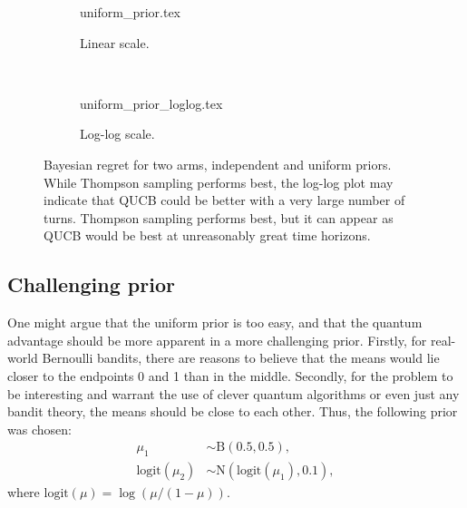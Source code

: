 \begin{figure}
    \centering
    \begin{subfigure}{\textwidth}
        \centering
        \newcommand{\myoptions}{
            width=10cm,
            height=8cm,
            xlabel={Turn},
            ylabel={Regret},
            legend entries={UCB, QUCB, Thompson},
            legend pos=north west,
            legend cell align=left,
            mystyle,
            largexnumbers,
            ymax = 135,
        }
        {uniform_prior.tex}
        \caption{Linear scale.}
    \end{subfigure}
    \\[3ex]
    \begin{subfigure}{\textwidth}
        \centering
        \newcommand{\myoptions}{
            width=10cm,
            height=8cm,
            xlabel={Turn},
            ylabel={Regret},
            legend entries={UCB, QUCB, Thompson},
            legend pos=north west,
            legend cell align=left,
            mystyle,
            largexnumbers,
        }
        {uniform_prior_loglog.tex}
        \caption{Log-log scale.}
    \end{subfigure}
    \caption[
        Bayesian regret for two arms, independent and uniform priors.
    ]
    {
        Bayesian regret for two arms, independent and uniform priors.
        While Thompson sampling performs best, the log-log plot may indicate that QUCB could be better with a very large number of turns.
        Thompson sampling performs best, but it can appear as QUCB would be best at unreasonably great time horizons.
    }
    \label{fig:random}
\end{figure}


\subsection{Challenging prior}
One might argue that the uniform prior is too easy, and that the quantum advantage should be more apparent in a more challenging prior.
Firstly, for real-world Bernoulli bandits, there are reasons to believe that the means would lie closer to the endpoints 0 and 1 than in the middle.
Secondly, for the problem to be interesting and warrant the use of clever quantum algorithms or even just any bandit theory, the means should be close to each other.
Thus, the following prior was chosen:
\begin{equation}
    \label{eq:challenging_prior}
    \begin{aligned}
        \mu_1               & \sim \text{B}(0.5, 0.5),                 \\
        \text{logit}(\mu_2) & \sim \text{N}(\text{logit}(\mu_1), 0.1),
    \end{aligned}
\end{equation}
where $\text{logit}(\mu) = \log(\mu/(1-\mu))$.

